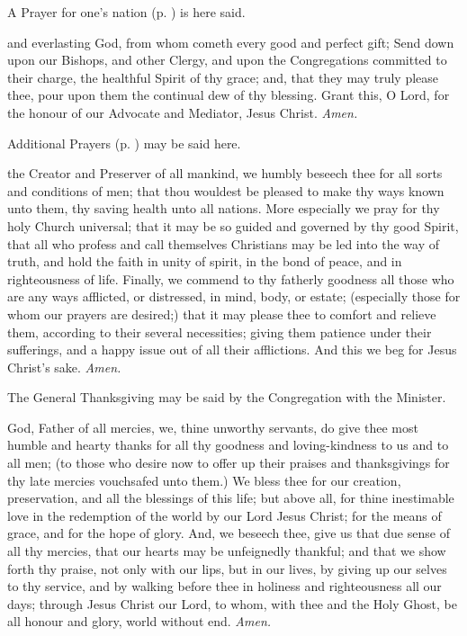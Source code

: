 \begin{rubric}
    A Prayer for one's nation (p. \pageref{prayers}) is here said.
\end{rubric}
\vspace{-2ex}
 and everlasting God, from whom cometh every good and perfect gift; Send down upon our Bishops, and other Clergy, and upon the Congregations committed to their charge, the healthful Spirit of thy grace; and, that they may truly please thee, pour upon them the continual dew of thy blessing. Grant this, O Lord, for the honour of our Advocate and Mediator, Jesus Christ. \textit{Amen.}
\begin{rubric}
    Additional Prayers (p. \pageref{prayers}) may be said here.
\end{rubric}
\vspace{-2ex}
 the Creator and Preserver of all mankind, we humbly beseech thee for all sorts and conditions of men; that thou wouldest be pleased to make thy ways known unto them, thy saving health unto all nations. More especially we pray for thy holy Church universal; that it may be so guided and governed by thy good Spirit, that all who profess and call themselves Christians may be led into the way of truth, and hold the faith in unity of spirit, in the bond of peace, and in righteousness of life. Finally, we commend to thy fatherly goodness all those who are any ways afflicted, or distressed, in mind, body, or estate; (especially those for whom our prayers are desired;) that it may please thee to comfort and relieve them, according to their several necessities; giving them patience under their sufferings, and a happy issue out of all their afflictions. And this we beg for Jesus Christ's sake. \textit{Amen.}
\begin{rubric}
    The General Thanksgiving may be said by the Congregation with the Minister.
\end{rubric}
 God, Father of all mercies, we, thine unworthy servants, do give thee most humble and hearty thanks for all thy goodness and loving-kindness to us and to all men; (to those who desire now to offer up their praises and thanksgivings for thy late mercies vouchsafed unto them.) We bless thee for our creation, preservation, and all the blessings of this life; but above all, for thine inestimable love in the redemption of the world by our Lord Jesus Christ; for the means of grace, and for the hope of glory. And, we beseech thee, give us that due sense of all thy mercies, that our hearts may be unfeignedly thankful; and that we show forth thy praise, not only with our lips, but in our lives, by giving up our selves to thy service, and by walking before thee in holiness and righteousness all our days; through Jesus Christ our Lord, to whom, with thee and the Holy Ghost, be all honour and glory, world without end. \textit{Amen.}

